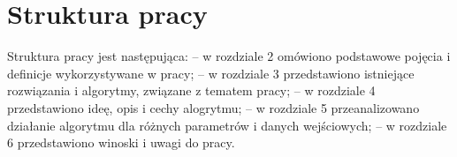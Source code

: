 \section{Struktura pracy}
\label{c14}   
Struktura pracy jest następująca:\newline
-- w rozdziale 2 omówiono podstawowe pojęcia i definicje wykorzystywane w pracy;\newline
-- w rozdziale 3 przedstawiono istniejące rozwiązania i algorytmy, związane z tematem pracy;\newline
-- w rozdziale 4 przedstawiono ideę, opis i cechy alogrytmu;\newline
-- w rozdziale 5 przeanalizowano działanie algorytmu dla różnych parametrów i danych wejściowych;\newline
-- w rozdziale 6 przedstawiono winoski i uwagi do pracy.